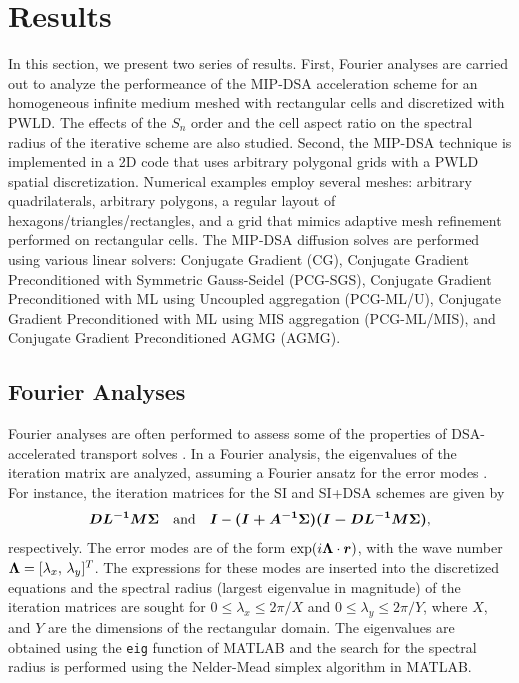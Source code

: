 \section{Results} \label{sec_res}

In this section, we present two series of results. First, Fourier analyses are 
carried out to analyze the performeance of the MIP-DSA acceleration scheme 
for an homogeneous infinite medium meshed with rectangular cells and discretized with PWLD.
The effects of the $S_n$ order and the cell aspect ratio on the spectral radius of the iterative 
scheme are also studied. Second, the MIP-DSA technique is implemented in a 2D \sn code that uses
arbitrary polygonal grids with a PWLD spatial discretization.  Numerical examples employ
several meshes: arbitrary quadrilaterals, arbitrary polygons, a regular layout of 
hexagons/triangles/rectangles, and a grid that mimics adaptive mesh refinement 
performed on rectangular cells. The MIP-DSA diffusion solves are performed using various
linear solvers: Conjugate Gradient (CG), Conjugate Gradient
Preconditioned with Symmetric Gauss-Seidel (PCG-SGS), Conjugate Gradient
Preconditioned with ML using Uncoupled aggregation (PCG-ML/U),
Conjugate Gradient Preconditioned with ML using MIS aggregation (PCG-ML/MIS),
and Conjugate Gradient Preconditioned AGMG (AGMG). 

\subsection{Fourier Analyses}

Fourier analyses are often performed to assess some of the properties of 
DSA-accelerated transport solves \cite{larsen_dsa,consistent_p1,more}. In a Fourier analysis,
the eigenvalues of the iteration matrix are analyzed, assuming a Fourier ansatz for the 
error modes \cite{}. For instance, the iteration matrices for the SI and SI+DSA schemes are given by
\begin{equation}
\boldsymbol{D L^{-1}M \Sigma} \quad \text{and} \quad \boldsymbol{I}-\boldsymbol{(I+A^{-1}\Sigma)(I-D L^{-1}M \Sigma)},
\end{equation}
respectively. The error modes are of the form $\exp(i \boldsymbol{\Lambda} \cdot \boldsymbol{r})$, with the
wave number $\boldsymbol{\Lambda}=[\lambda_x,\, \lambda_y]^T$. The expressions for these modes 
are inserted into the discretized equations and the spectral radius (largest eigenvalue in magnitude)
of the iteration matrices are sought for $0 \le \lambda_x \le 2\pi/X$ and $0 \le \lambda_y \le 2\pi/Y$,
where $X$, and $Y$ are the dimensions of the rectangular domain. The eigenvalues are obtained
using the {\tt eig} function of MATLAB and the search for the spectral radius is performed
using the Nelder-Mead simplex algorithm in MATLAB.


